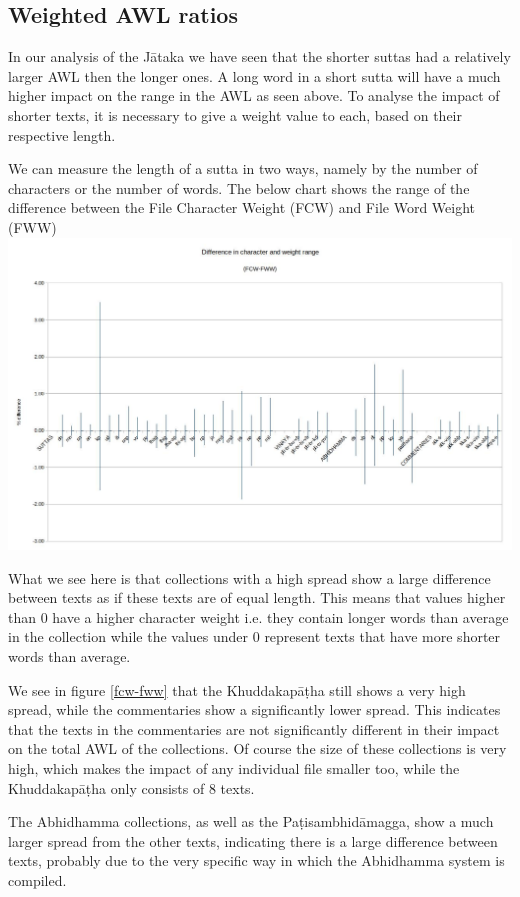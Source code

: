 \subsection{Weighted AWL ratios}
In our analysis of the Jātaka we have seen that the shorter suttas had a relatively larger AWL then the longer ones. A long word in a short sutta will have a much higher impact on the range in the AWL as seen above. To analyse the impact of shorter texts, it is necessary to give a weight value to each, based on their respective length.

We can measure the length of a sutta in two ways, namely by the number of characters or the number of words. The below chart shows the range of the difference between the File Character Weight (FCW) and File Word Weight (FWW)\\

\includegraphics[width=\linewidth]{fcw-fww.jpg}
\label{fcw-fww}

\medskip
What we see here is that collections with a high spread show a large difference between texts as if these texts are of equal length. This means that values higher than 0 have a higher character weight i.e. they contain longer words than average in the collection while the values under 0 represent texts that have more shorter words than average. 

We see in figure \ref{fcw-fww} that the Khuddakapāṭha still shows a very high spread, while the commentaries show a significantly lower spread. This indicates that the texts in the commentaries are not significantly different in their impact on the total AWL of the collections. Of course the size of these collections is very high, which makes the impact of any individual file smaller too, while the Khuddakapāṭha only consists of 8 texts.

The Abhidhamma collections, as well as the Paṭisambhidāmagga, show a much larger spread from the other texts, indicating there is a large difference between texts, probably due to the very specific way in which the Abhidhamma system is compiled.

